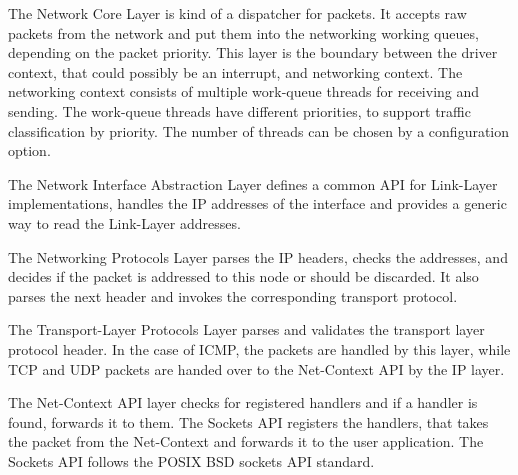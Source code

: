 The Network Core Layer is kind of a dispatcher for packets.
It accepts raw packets from the network and put them into the networking working queues, depending on the packet priority.
This layer is the boundary between the driver context, that could possibly be an interrupt, and networking context.
The networking context consists of multiple work-queue threads for receiving and sending.
The work-queue threads have different priorities, to support traffic classification by priority.
The number of threads can be chosen by a configuration option.

The Network Interface Abstraction Layer defines a common API for Link-Layer implementations,
handles the IP addresses of the interface and provides a generic way to read the Link-Layer addresses.

The Networking Protocols Layer parses the IP headers, checks the addresses, and decides if the packet is addressed to this node or should be discarded.
It also parses the next header and invokes the corresponding transport protocol.

The Transport-Layer Protocols Layer parses and validates the transport layer protocol header.
In the case of ICMP, the packets are handled by this layer, while TCP and UDP packets are handed over to the Net-Context API by the IP layer.

The Net-Context API layer checks for registered handlers and if a handler is found, forwards it to them.
The Sockets API registers the handlers, that takes the packet from the Net-Context and forwards it to the user application.
The Sockets API follows the POSIX \cite{posix} BSD sockets API standard.
